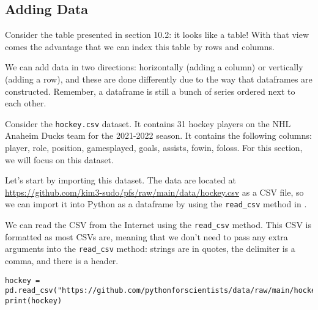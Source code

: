 \subsection{Adding Data}
Consider the table presented in section 10.2: it looks like a table! With that view comes the advantage that we can index this table by rows and columns.\par
{}
We can add data in two directions: horizontally (adding a column) or vertically (adding a row), and these are done differently due to the way that dataframes are constructed. Remember, a  dataframe is still a bunch of  series ordered next to each other.\par
Consider the \verb|hockey.csv| dataset. It contains 31 hockey players on the NHL Anaheim Ducks team for the 2021-2022 season. It contains the following columns: player, role, position, gamesplayed, goals, assists, fowin, foloss. For this section, we will focus on this dataset.\par
Let's start by importing this dataset. The data are located at\\ \href{https://github.com/kim3-sudo/pfs/raw/main/data/hockey.csv}{https://github.com/kim3-sudo/pfs/raw/main/data/hockey.csv} as a CSV file, so we can import it into Python as a  dataframe by using the \verb|read_csv| method in .\par
{}
We can read the CSV from the Internet using the \verb|read_csv| method. This CSV is formatted as most CSVs are, meaning that we don't need to pass any extra arguments into the \verb|read_csv| method: strings are in quotes, the delimiter is a comma, and there is a header.
\begin{lstlisting}[style=pippython]
hockey = pd.read_csv("https://github.com/pythonforscientists/data/raw/main/hockey.csv")
print(hockey)
\end{lstlisting}
